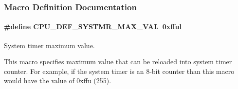 \subsubsection{Macro Definition Documentation}
\hypertarget{group__template__family__cfg_gaed6437f330e7be6f8d5a04a19cbe8776}{
\paragraph[{C\-P\-U\-\_\-\-D\-E\-F\-\_\-\-S\-Y\-S\-T\-M\-R\-\_\-\-M\-A\-X\-\_\-\-V\-A\-L}]{\setlength{\rightskip}{0pt plus 5cm}\#define C\-P\-U\-\_\-\-D\-E\-F\-\_\-\-S\-Y\-S\-T\-M\-R\-\_\-\-M\-A\-X\-\_\-\-V\-A\-L~0xfful}}\label{group__template__family__cfg_gaed6437f330e7be6f8d5a04a19cbe8776}


System timer maximum value. 

This macro specifies maximum value that can be reloaded into system timer counter. For example, if the system timer is an 8-\/bit counter than this macro would have the value of 0xffu (255). 